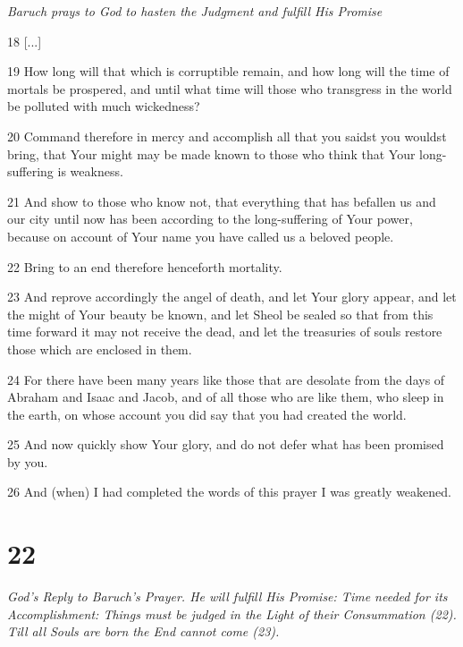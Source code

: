 \par \textit{Baruch prays to God to hasten the Judgment and fulfill His Promise}

\par 18 [...]

\par 19 How long will that which is corruptible remain, and how long will the time of mortals be prospered, and until what time will those who transgress in the world be polluted with much wickedness? 

\par 20 Command therefore in mercy and accomplish all that you saidst you wouldst bring, that Your might may be made known to those who think that Your long-suffering is weakness. 

\par 21 And show to those who know not, that everything that has befallen us and our city until now has been according to the long-suffering of Your power, because on account of Your name you have called us a beloved people. 

\par 22 Bring to an end therefore henceforth mortality. 

\par 23 And reprove accordingly the angel of death, and let Your glory appear, and let the might of Your beauty be known, and let Sheol be sealed so that from this time forward it may not receive the dead, and let the treasuries of souls restore those which are enclosed in them. 

\par 24 For there have been many years like those that are desolate from the days of Abraham and Isaac and Jacob, and of all those who are like them, who sleep in the earth, on whose account you did say that you had created the world. 

\par 25 And now quickly show Your glory, and do not defer what has been promised by you.

\par 26 And (when) I had completed the words of this prayer I was greatly weakened.

\chapter{22}

\par \textit{God's Reply to Baruch's Prayer. He will fulfill His Promise: Time needed for its Accomplishment: Things must be judged in the Light of their Consummation (22). Till all Souls are born the End cannot come (23).}

